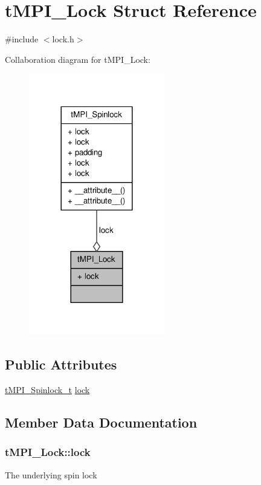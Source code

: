 \hypertarget{structtMPI__Lock}{\section{t\-M\-P\-I\-\_\-\-Lock \-Struct \-Reference}
\label{structtMPI__Lock}
}


{\ttfamily \#include $<$lock.\-h$>$}



\-Collaboration diagram for t\-M\-P\-I\-\_\-\-Lock\-:
\nopagebreak
\begin{figure}[H]
\begin{center}
\leavevmode
\includegraphics[width=168pt]{structtMPI__Lock__coll__graph}
\end{center}
\end{figure}
\subsection*{\-Public \-Attributes}
\begin{DoxyCompactItemize}
\item 
\hyperlink{structtMPI__Spinlock__t}{t\-M\-P\-I\-\_\-\-Spinlock\-\_\-t} \hyperlink{structtMPI__Lock_a1f2fcaacc945019e3c26a49c02f2843e}{lock}
\end{DoxyCompactItemize}


\subsection{\-Member \-Data \-Documentation}
\hypertarget{structtMPI__Lock_a1f2fcaacc945019e3c26a49c02f2843e}{
\subsubsection[{lock}]{ {\bf t\-M\-P\-I\-\_\-\-Lock\-::lock}}}\label{structtMPI__Lock_a1f2fcaacc945019e3c26a49c02f2843e}
\-The underlying spin lock 

